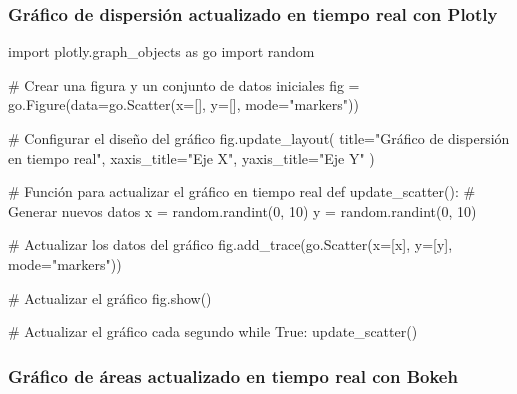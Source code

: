 \documentclass[
  a4paper,
]{article}
\newenvironment{Shaded}{}{}
\newcommand{\CommentTok}[1]{\textcolor[rgb]{0.42,0.45,0.49}{#1}}
\newcommand{\ControlFlowTok}[1]{\textcolor[rgb]{0.84,0.23,0.29}{#1}}
\newcommand{\DecValTok}[1]{\textcolor[rgb]{0.00,0.36,0.77}{#1}}
\newcommand{\ImportTok}[1]{\textcolor[rgb]{0.01,0.18,0.38}{#1}}
\newcommand{\KeywordTok}[1]{\textcolor[rgb]{0.84,0.23,0.29}{#1}}
\newcommand{\NormalTok}[1]{\textcolor[rgb]{0.14,0.16,0.18}{#1}}
\newcommand{\OperatorTok}[1]{\textcolor[rgb]{0.14,0.16,0.18}{#1}}
\newcommand{\StringTok}[1]{\textcolor[rgb]{0.01,0.18,0.38}{#1}}
\newcommand{\VariableTok}[1]{\textcolor[rgb]{0.89,0.38,0.04}{#1}}
\begin{document}
\hypertarget{gruxe1fico-de-dispersiuxf3n-actualizado-en-tiempo-real-con-plotly}{%
\subsubsection{Gráfico de dispersión actualizado en tiempo real con
Plotly}\label{gruxe1fico-de-dispersiuxf3n-actualizado-en-tiempo-real-con-plotly}}

\begin{Shaded}
\begin{Highlighting}[]
\ImportTok{import}\NormalTok{ plotly.graph\_objects }\ImportTok{as}\NormalTok{ go}
\ImportTok{import}\NormalTok{ random}

\CommentTok{\# Crear una figura y un conjunto de datos iniciales}
\NormalTok{fig }\OperatorTok{=}\NormalTok{ go.Figure(data}\OperatorTok{=}\NormalTok{go.Scatter(x}\OperatorTok{=}\NormalTok{[], y}\OperatorTok{=}\NormalTok{[], mode}\OperatorTok{=}\StringTok{"markers"}\NormalTok{))}

\CommentTok{\# Configurar el diseño del gráfico}
\NormalTok{fig.update\_layout(}
\NormalTok{    title}\OperatorTok{=}\StringTok{"Gráfico de dispersión en tiempo real"}\NormalTok{,}
\NormalTok{    xaxis\_title}\OperatorTok{=}\StringTok{"Eje X"}\NormalTok{,}
\NormalTok{    yaxis\_title}\OperatorTok{=}\StringTok{"Eje Y"}
\NormalTok{)}

\CommentTok{\# Función para actualizar el gráfico en tiempo real}
\KeywordTok{def}\NormalTok{ update\_scatter():}
    \CommentTok{\# Generar nuevos datos}
\NormalTok{    x }\OperatorTok{=}\NormalTok{ random.randint(}\DecValTok{0}\NormalTok{, }\DecValTok{10}\NormalTok{)}
\NormalTok{    y }\OperatorTok{=}\NormalTok{ random.randint(}\DecValTok{0}\NormalTok{, }\DecValTok{10}\NormalTok{)}

    \CommentTok{\# Actualizar los datos del gráfico}
\NormalTok{    fig.add\_trace(go.Scatter(x}\OperatorTok{=}\NormalTok{[x], y}\OperatorTok{=}\NormalTok{[y], mode}\OperatorTok{=}\StringTok{"markers"}\NormalTok{))}

    \CommentTok{\# Actualizar el gráfico}
\NormalTok{    fig.show()}

\CommentTok{\# Actualizar el gráfico cada segundo}
\ControlFlowTok{while} \VariableTok{True}\NormalTok{:}
\NormalTok{    update\_scatter()}
\end{Highlighting}
\end{Shaded}

\hypertarget{gruxe1fico-de-uxe1reas-actualizado-en-tiempo-real-con-bokeh}{%
\subsubsection{Gráfico de áreas actualizado en tiempo real con
Bokeh}\label{gruxe1fico-de-uxe1reas-actualizado-en-tiempo-real-con-bokeh}}
\end{document}
